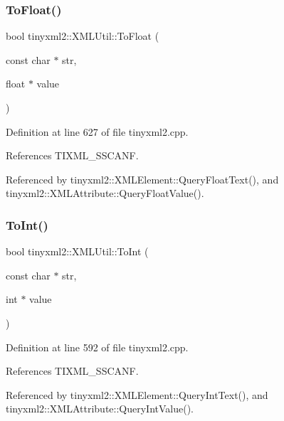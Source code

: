 \mbox{\label{classtinyxml2_1_1_x_m_l_util_a399e71edb5f29d61ea81d91ee0332bb9}} 
\subsubsection{To\+Float()}
{\footnotesize\ttfamily bool tinyxml2\+::\+X\+M\+L\+Util\+::\+To\+Float (\begin{DoxyParamCaption}\item[{const char $\ast$}]{str,  }\item[{float $\ast$}]{value }\end{DoxyParamCaption})\hspace{0.3cm}{\ttfamily [static]}}



Definition at line 627 of file tinyxml2.\+cpp.



References T\+I\+X\+M\+L\+\_\+\+S\+S\+C\+A\+NF.



Referenced by tinyxml2\+::\+X\+M\+L\+Element\+::\+Query\+Float\+Text(), and tinyxml2\+::\+X\+M\+L\+Attribute\+::\+Query\+Float\+Value().

\mbox{\label{classtinyxml2_1_1_x_m_l_util_ad4df4023d11ee3fca9689c49b9707323}} 
\subsubsection{To\+Int()}
{\footnotesize\ttfamily bool tinyxml2\+::\+X\+M\+L\+Util\+::\+To\+Int (\begin{DoxyParamCaption}\item[{const char $\ast$}]{str,  }\item[{int $\ast$}]{value }\end{DoxyParamCaption})\hspace{0.3cm}{\ttfamily [static]}}



Definition at line 592 of file tinyxml2.\+cpp.



References T\+I\+X\+M\+L\+\_\+\+S\+S\+C\+A\+NF.



Referenced by tinyxml2\+::\+X\+M\+L\+Element\+::\+Query\+Int\+Text(), and tinyxml2\+::\+X\+M\+L\+Attribute\+::\+Query\+Int\+Value().

